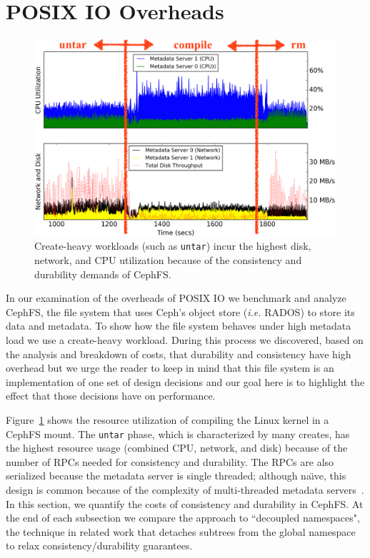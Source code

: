\section{POSIX IO Overheads}
\label{sec:posix-overheads}

\begin{figure}[tb]
\centering
\includegraphics[width=1\linewidth]{././chapters/cudele/figures/overhead-creates.png}
\caption{Create-heavy workloads (such as \texttt{untar}) incur the highest disk, network, and
CPU utilization because of the consistency and durability demands of
CephFS.}\label{fig:overhead-creates}
\end{figure}

In our examination of the overheads of POSIX IO we benchmark and analyze
CephFS, the file system that uses Ceph's object store ({\it i.e.} RADOS) to
store its data and metadata. To show how the file system behaves under high
metadata load we use a create-heavy workload.  During this process we
discovered, based on the analysis and breakdown of costs, that durability and
consistency have high overhead but we urge the reader to keep in mind that this
file system is an implementation of one set of design decisions and our goal
here is to highlight the effect that those decisions have on performance.

Figure~\ref{fig:overhead-creates} shows the resource utilization of compiling
the Linux kernel in a CephFS mount.  The \texttt{untar} phase, which is
characterized by many creates, has the highest resource usage (combined CPU,
network, and disk) because of the number of RPCs needed for consistency and
durability. The RPCs are also serialized because the metadata server is single
threaded; although na\"{\i}ve, this design is common because of the complexity
of multi-threaded metadata
servers~\cite{konstantinos:pdsw2014-lustre-metadata}.  In this section, we
quantify the costs of consistency and durability in CephFS.  At the end of each
subsection we compare the approach to ``decoupled namespaces", the technique in
related work that detaches subtrees from the global namespace to relax
consistency/durability guarantees. 

